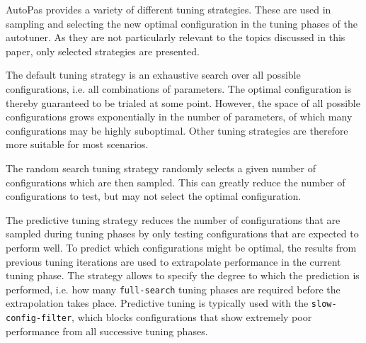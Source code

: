 AutoPas provides a variety of different tuning strategies. These are used in sampling and selecting the new optimal configuration in the tuning phases of the autotuner. As they are not particularly relevant to the topics discussed in this paper, only selected strategies are presented.
\begin{description}[leftmargin=!,labelwidth=\widthof{\textbf{PredictiveTuning }}]
	\item[\textbf{FullSearch}] The default tuning strategy is an exhaustive search over all possible configurations, i.e. all combinations of parameters. The optimal configuration is thereby guaranteed to be trialed at some point. However, the space of all possible configurations grows exponentially in the number of parameters, of which many configurations may be highly suboptimal. Other tuning strategies are therefore more suitable for most scenarios.
	\item[\textbf{RandomSearch}] The random search tuning strategy randomly selects a given number of configurations which are then sampled. This can greatly reduce the number of configurations to test, but may not select the optimal configuration.
	\item[\textbf{PredictiveTuning}] The predictive tuning strategy reduces the number of configurations that are sampled during tuning phases by only testing configurations that are expected to perform well. To predict which configurations might be optimal, the results from previous tuning iterations are used to extrapolate performance in the current tuning phase. The strategy allows to specify the degree to which the prediction is performed, i.e. how many \texttt{full-search} tuning phases are required before the extrapolation takes place. Predictive tuning is typically used with the \texttt{slow-config-filter}, which blocks configurations that show extremely poor performance from all successive tuning phases. \cite{Pelloth2020}
\end{description}


